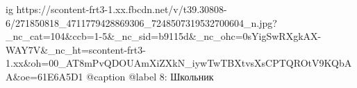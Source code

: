  
 
 
 
 

\ifcmt
  ig https://scontent-frt3-1.xx.fbcdn.net/v/t39.30808-6/271850818_4711779428869306_7248507319532700604_n.jpg?_nc_cat=104&ccb=1-5&_nc_sid=b9115d&_nc_ohc=0sYigSwRXgkAX-WAY7V&_nc_ht=scontent-frt3-1.xx&oh=00_AT8mPvQDOUAmXiZXkN_iywTwTBXtvsXsCPTQROtV9KQbAA&oe=61E6A5D1
  @caption @label 8: Школьник
\fi
